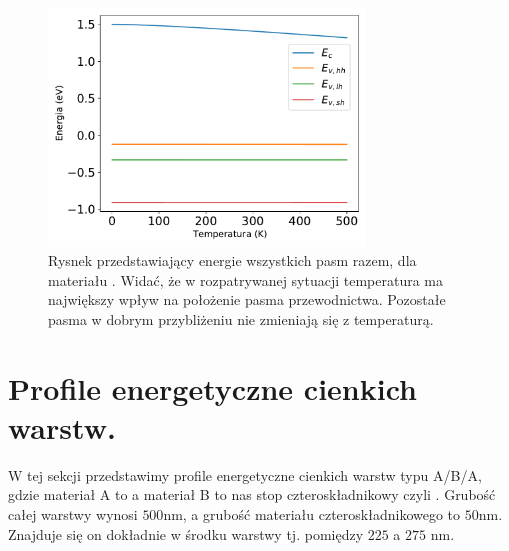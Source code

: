 \documentclass[12pt,openany,a4paper]{book}
\begin{document}
\begin{figure}[H]
	\centering
	\includegraphics[width = 0.75\textwidth]{Figures/strain/one.pdf}
	\caption{Rysnek przedstawiający energie wszystkich pasm razem, dla materiału 
	. Widać, że w rozpatrywanej sytuacji temperatura
	ma największy wpływ na położenie pasma przewodnictwa. Pozostałe pasma w dobrym przybliżeniu nie zmieniają się
	z temperaturą.}
	\label{fig:allE}
\end{figure}

\section{Profile energetyczne cienkich warstw.\label{sec:thin_layer}}

W tej sekcji przedstawimy profile energetyczne cienkich warstw typu A/B/A,
gdzie materiał A to  a materiał B to nas stop czteroskładnikowy czyli
. Grubość całej warstwy wynosi \(500\)nm, a grubość
materiału czteroskładnikowego to \(50\)nm. Znajduje się on dokładnie w środku warstwy tj.
pomiędzy \(225\) a \(275\) nm.
\end{document}
